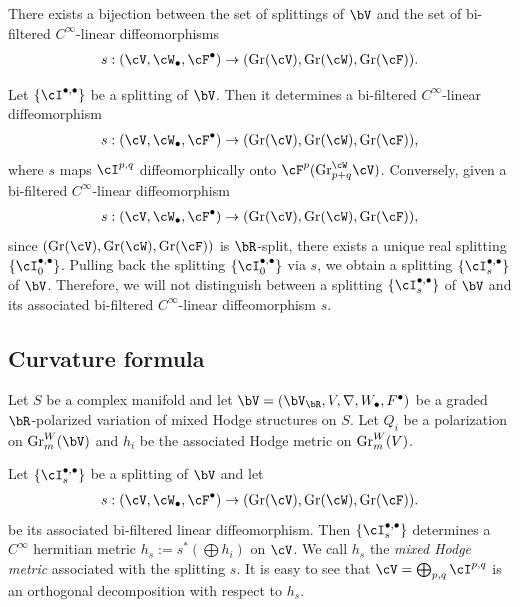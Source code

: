 \documentclass[11pt,letterpaper]{amsart}
\numberwithin{equation}{section}
\begin{document}
	There exists a bijection between the set of splittings of $\bV$ and the set of bi-filtered $C^\infty$-linear diffeomorphisms  
	\begin{align}  
		s: (\cV, \cW_\bullet, \cF^\bullet) \to ({\rm Gr}(\cV), {\rm Gr}(\cW), {\rm Gr}(\cF)).  
	\end{align}  
	
	Let $\{\cI^{\bullet,\bullet}\}$ be a splitting of $\bV$. Then it determines a bi-filtered $C^\infty$-linear diffeomorphism  
	\begin{align}  
		s: (\cV, \cW_\bullet, \cF^\bullet) \to ({\rm Gr}(\cV), {\rm Gr}(\cW), {\rm Gr}(\cF)),  
	\end{align}  
	where $s$ maps $\cI^{p,q}$ diffeomorphically onto $\cF^p({\rm Gr}^\cW_{p+q}\cV)$. Conversely, given a bi-filtered $C^\infty$-linear diffeomorphism  
	\begin{align}  
		s: (\cV, \cW_\bullet, \cF^\bullet) \to ({\rm Gr}(\cV), {\rm Gr}(\cW), {\rm Gr}(\cF)),  
	\end{align}  
	since $({\rm Gr}(\cV), {\rm Gr}(\cW), {\rm Gr}(\cF))$ is $\bR$-split, there exists a unique real splitting $\{\cI^{\bullet,\bullet}_0\}$. Pulling back the splitting $\{\cI^{\bullet,\bullet}_0\}$ via $s$, we obtain a splitting $\{\cI^{\bullet,\bullet}_s\}$ of $\bV$. Therefore, we will not distinguish between a splitting $\{\cI^{\bullet,\bullet}_s\}$ of $\bV$ and its associated bi-filtered $C^\infty$-linear diffeomorphism $s$.
	\subsection{Curvature formula}
	Let $S$ be a complex manifold and let $\bV=(\bV_{\bR},V,\nabla,W_\bullet,F^\bullet)$ be a graded $\bR$-polarized variation of mixed Hodge structures on $S$. Let $Q_i$ be a polarization on ${\rm Gr}^W_m(\bV)$ and $h_i$ be the associated Hodge metric on ${\rm Gr}^W_m(V)$.
	
	Let $\{\cI^{\bullet,\bullet}_s\}$ be a splitting of $\bV$ and let 
	\begin{align}
		s:(\cV,\cW_\bullet,\cF^\bullet)\to({\rm Gr}(\cV),{\rm Gr}(\cW),{\rm Gr}(\cF)).
	\end{align}
	be its associated bi-filtered linear diffeomorphism. Then $\{\cI^{\bullet,\bullet}_s\}$ determines a $C^\infty$ hermitian metric $h_s:=s^\ast(\bigoplus h_i)$ on $\cV$. We call $h_s$ the \emph{mixed Hodge metric} associated with the splitting $s$.
	It is easy to see that $\cV=\bigoplus_{p,q}\cI^{p,q}$ is an orthogonal decomposition with respect to $h_s$. 
	
\end{document}
